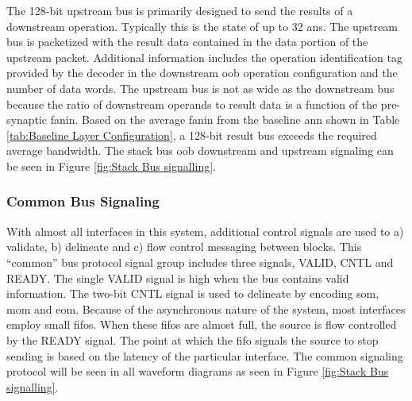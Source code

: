 The 128-bit upstream bus is primarily designed to send the results of a downstream operation. Typically this is the state of up to 32 \acp{an}.
The upstream bus is packetized with the result data contained in the data portion of the upstream packet.
Additional information includes the operation identification tag provided by the decoder in the downstream \ac{oob} operation configuration and the number of data words.
The upstream bus is not as wide as the downstream bus because the ratio of downstream operands to result data is a function of the pre-synaptic fanin.
Based on the average fanin from the baseline \ac{ann} shown in Table \ref{tab:Baseline Layer Configuration}, a 128-bit result bus exceeds the required average bandwidth.
The stack bus \ac{oob} downstream and upstream signaling can be seen in Figure \ref{fig:Stack Bus signalling}.

\subsubsection{Common Bus Signaling}
\label{sec:Common Bus Signalling}

With almost all interfaces in this system, additional control signals are used to a) validate, b) delineate and c) flow control messaging between blocks.
This ``common'' bus protocol signal group includes three signals, VALID, CNTL and READY. 
The single VALID signal is high when the bus contains valid information. The two-bit CNTL signal is used to delineate by encoding \ac{som}, \ac{mom} and \ac{eom}.
Because of the asynchronous nature of the system, most interfaces employ small \acp{fifo}. When these \acp{fifo} are almost full, the source is flow controlled by the READY signal. 
The point at which the \ac{fifo} signals the source to stop sending is based on the latency of the particular interface. 
The common signaling protocol will be seen in all waveform diagrams as seen in Figure \ref{fig:Stack Bus signalling}.


